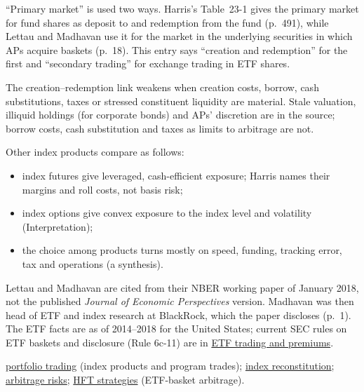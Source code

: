 \begin{qfmechanism}
 ``Primary market'' is used two ways. Harris's Table~23-1 gives the primary market for fund shares as deposit to and redemption from the fund (p.~491), while Lettau and Madhavan use it for the market in the underlying securities in which APs acquire baskets (p.~18). This entry says ``creation and redemption'' for the first and ``secondary trading'' for exchange trading in ETF shares.

The creation--redemption link weakens when creation costs, borrow, cash substitutions, taxes or stressed constituent liquidity are material. Stale valuation, illiquid holdings (for corporate bonds) and APs' discretion are in the source; borrow costs, cash substitution and taxes as limits to arbitrage are not.

Other index products compare as follows:
\begin{itemize}
\item index futures give leveraged, cash-efficient exposure; Harris names their margins and roll costs, not basis risk;
\item index options give convex exposure to the index level and volatility (Interpretation);
\item the choice among products turns mostly on speed, funding, tracking error, tax and operations (a synthesis).
\end{itemize}

Lettau and Madhavan are cited from their NBER working paper of January 2018, not the published \emph{Journal of Economic Perspectives} version. Madhavan was then head of ETF and index research at BlackRock, which the paper discloses (p.~1). The ETF facts are as of 2014--2018 for the United States; current SEC rules on ETF baskets and disclosure (Rule 6c-11) are in \hyperref[meth:etf-trading-tracking-premiums]{ETF trading and premiums}.

 \hyperref[def:portfolio-trading]{portfolio trading} (index products and program trades); \hyperref[ev:index-reconstitution-impact]{index reconstitution}; \hyperref[res:arbitrage-risks]{arbitrage risks}; \hyperref[def:hft-strategies]{HFT strategies} (ETF-basket arbitrage).

\end{qfmechanism}

